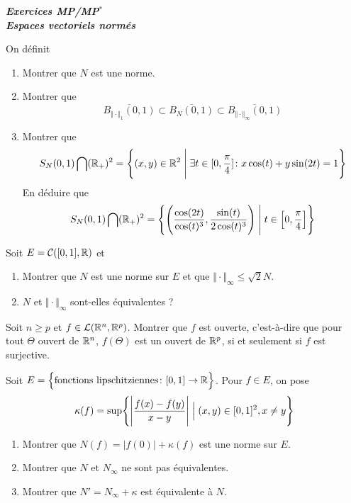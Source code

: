 \documentclass[12pt]{article}
\begin{document}
\begin{titlepage}
	\centering
	\vspace*{\fill}
	\Huge \textit{\textbf{Exercices MP/MP$^*$\\ Espaces vectoriels normés}}
	\vspace*{\fill}
\end{titlepage}

\begin{exercise}
	On définit 
	\begin{enumerate}
		\item Montrer que $N$ est une norme.
		\item Montrer que $$\overline{B_{\Vert\cdot\Vert_{1}}(0,1)}\subset \overline{B_{N}(0,1)}\subset\overline{B_{\Vert\cdot\Vert_{\infty}}(0,1)}$$
		\item Montrer que $$S_{N}(0,1)\bigcap(\mathbb{R}_{+})^{2}=\Biggl\{(x,y)\in\mathbb{R}^{2}\Biggm|\exists t\in[0,\frac{\pi}{4}]\colon x\cos(t)+y\sin(2t)=1\Biggr\}$$
		En déduire que $$S_{N}(0,1)\bigcap(\mathbb{R}_{+})^{2}=\Biggl\{\Biggl(\frac{\cos(2t)}{\cos(t)^{3}},\frac{\sin(t)}{2\cos(t)^{3}}\Biggr)\Biggm| t\in\Bigl[0,\frac{\pi}{4}\Bigr]\Biggr\}$$
	\end{enumerate}
\end{exercise}

\begin{exercise}
	Soit $E=\mathcal{C}([0,1],\mathbb{R})$ et 
	\begin{enumerate}
		\item Montrer que $N$ est une norme sur $E$ et que $\Vert\cdot\Vert_{\infty}\leqslant\sqrt{2}N$.
		\item $N$ et $\Vert\cdot\Vert_{\infty}$ sont-elles équivalentes ?
	\end{enumerate}
\end{exercise}

\begin{exercise}
	Soit $n\geqslant p$ et $f\in\mathcal{L}(\mathbb{R}^{n},\mathbb{R}^{p})$. Montrer que $f$ est ouverte, c'est-à-dire que pour tout $\Theta$ ouvert de $\mathbb{R}^{n}$, $f(\Theta)$ est un ouvert de $\mathbb{R}^{p}$, si et seulement si $f$ est surjective.
\end{exercise}

\begin{exercise}
	Soit $E=\Bigl\{\text{fonctions lipschitziennes}\colon [0,1]\to\mathbb{R}\Bigr\}$. Pour $f\in E$, on pose 
	$$\kappa(f)=\sup\Biggl\{\Biggl\lvert\frac{f(x)-f(y)}{x-y}\Biggr\rvert\Bigm|(x,y)\in[0,1]^{2},x\neq y\Biggr\}$$
	\begin{enumerate}
		\item Montrer que $N(f)=\vert f(0)\vert+\kappa(f)$ est une norme sur $E$.
		\item Montrer que $N$ et $N_{\infty}$ ne sont pas équivalentes.
		\item Montrer que $N'=N_{\infty}+\kappa$ est équivalente à $N$.
	\end{enumerate}
\end{exercise}
\end{document}
